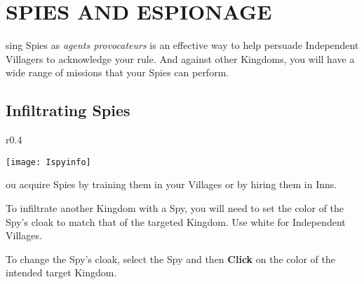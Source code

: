 
\chapter[Spies and Espionage]{\textsf{SPIES AND ESPIONAGE}}


sing Spies as \textit{agents provocateurs} is an effective way to help persuade Independent Villagers to acknowledge your rule. And against other Kingdoms, you will have a wide range of missions that your Spies can perform.

\section{\textsf{Infiltrating Spies}}

\begin{wrapfigure}{r}{0.4\textwidth}
    \vspace{-20pt}
    \begin{center}
        \texttt{[image: Ispyinfo]} %
    \end{center}
    \vspace{-15pt}
\end{wrapfigure}


ou acquire Spies by training them in your Villages or by hiring them in Inns.

To infiltrate another Kingdom with a Spy, you will need to set the color of the Spy’s cloak to match that of the targeted Kingdom. Use white for Independent Villages.

To change the Spy’s cloak, select the Spy and then \textbf{Click} on the color of the intended target Kingdom.

